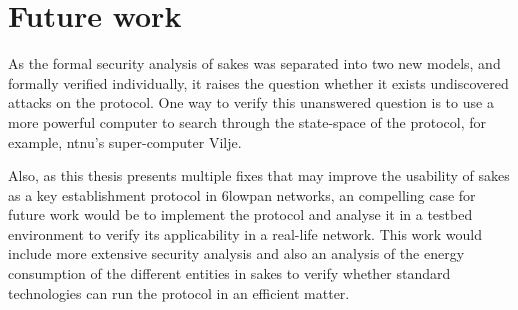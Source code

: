 \section{Future work}

As the formal security analysis of \gls{sakes} was separated into two new models, and formally verified individually, it raises the question whether it exists undiscovered attacks on the protocol. One way to verify this unanswered question is to use a more powerful computer to search through the state-space of the protocol, for example, \gls{ntnu}'s super-computer Vilje.  

Also, as this thesis presents multiple fixes that may improve the usability of \gls{sakes} as a key establishment protocol in \gls{6lowpan} networks, an compelling case for future work would be to implement the protocol and analyse it in a testbed environment to verify its applicability in a real-life network. This work would include more extensive security analysis and also an analysis of the energy consumption of the different entities in \gls{sakes} to verify whether standard technologies can run the protocol in an efficient matter.






%